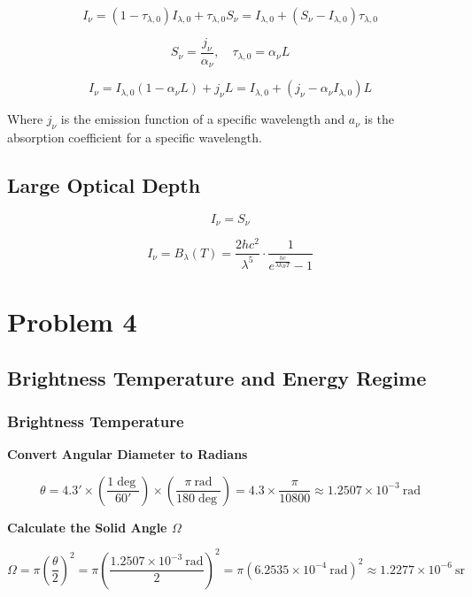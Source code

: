 \documentclass[12pt]{article}
\begin{document}
\[
    I_\nu = (1 - \tau_{\lambda,0})I_{\lambda,0} + \tau_{\lambda,0}S_\nu = I_{\lambda,0} + (S_\nu - I_{\lambda,0})\tau_{\lambda,0}
\]

\[
    S_\nu = \frac{j_\nu}{\alpha_\nu},\quad \tau_{\lambda,0} = \alpha_\nu L
\]

\[
    I_\nu = I_{\lambda,0} (1 - \alpha_\nu L) + j_\nu L = I_{\lambda,0} + (j_\nu - \alpha_\nu I_{\lambda,0})L
\]

Where $j_\nu$ is the emission function of a specific wavelength and $a_\nu$ is the absorption coefficient for a specific wavelength.

\subsection{Large Optical Depth}

\[
    I_\nu = S_\nu
\]

\[
    I_\nu = B_\lambda(T) = \frac{2 h c^2}{\lambda^5} \cdot \frac{1}{e^{\frac{h c}{\lambda k_B T}} - 1}
\]

\newpage

\section{Problem 4}

\subsection{Brightness Temperature and Energy Regime}

\subsubsection{Brightness Temperature}

\bigskip

\textbf{Convert Angular Diameter to Radians}

{\footnotesize
    \[
        \theta = 4.3' \times \left( \dfrac{1\deg}{60'} \right) \times \left( \dfrac{\pi\ \text{rad}}{180\deg} \right) = 4.3 \times \dfrac{\pi}{10800} \approx 1.2507 \times 10^{-3}\ \text{rad}
    \]
}

\textbf{Calculate the Solid Angle $\Omega$}

{\footnotesize
    \[
        \Omega = \pi {\left( \dfrac{\theta}{2} \right)}^2 = \pi {\left( \dfrac{1.2507 \times 10^{-3}\ \text{rad}}{2} \right)}^2 = \pi {\left( 6.2535 \times 10^{-4}\ \text{rad} \right)}^2 \approx 1.2277 \times 10^{-6}\ \text{sr}
    \]
}
\end{document}
